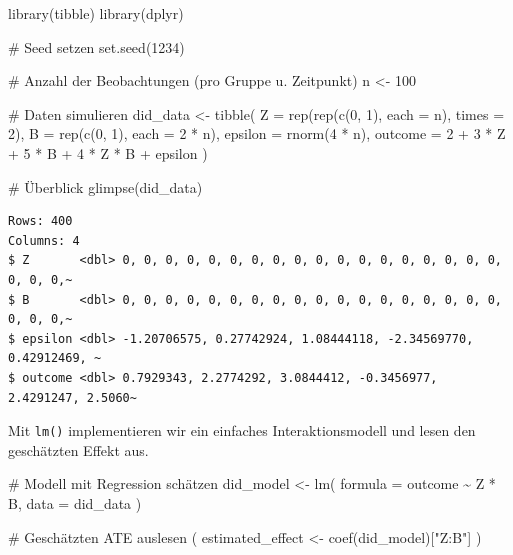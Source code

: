 \documentclass[
  a4paper,
  DIV=11,
  oneside]{scrreprt}
\newenvironment{Shaded}{\begin{snugshade}}{\end{snugshade}}
\newcommand{\AttributeTok}[1]{\textcolor[rgb]{0.40,0.45,0.13}{#1}}
\newcommand{\CommentTok}[1]{\textcolor[rgb]{0.37,0.37,0.37}{#1}}
\newcommand{\DecValTok}[1]{\textcolor[rgb]{0.68,0.00,0.00}{#1}}
\newcommand{\FunctionTok}[1]{\textcolor[rgb]{0.28,0.35,0.67}{#1}}
\newcommand{\NormalTok}[1]{\textcolor[rgb]{0.00,0.23,0.31}{#1}}
\newcommand{\OtherTok}[1]{\textcolor[rgb]{0.00,0.23,0.31}{#1}}
\newcommand{\SpecialCharTok}[1]{\textcolor[rgb]{0.37,0.37,0.37}{#1}}
\newcommand{\StringTok}[1]{\textcolor[rgb]{0.13,0.47,0.30}{#1}}
\begin{document}
\begin{Shaded}
\begin{Highlighting}[]
\FunctionTok{library}\NormalTok{(tibble)}
\FunctionTok{library}\NormalTok{(dplyr)}

\CommentTok{\# Seed setzen}
\FunctionTok{set.seed}\NormalTok{(}\DecValTok{1234}\NormalTok{)}

\CommentTok{\# Anzahl der Beobachtungen (pro Gruppe u. Zeitpunkt)}
\NormalTok{n }\OtherTok{\textless{}{-}} \DecValTok{100}

\CommentTok{\# Daten simulieren}
\NormalTok{did\_data }\OtherTok{\textless{}{-}} \FunctionTok{tibble}\NormalTok{(}
  \AttributeTok{Z =} \FunctionTok{rep}\NormalTok{(}\FunctionTok{rep}\NormalTok{(}\FunctionTok{c}\NormalTok{(}\DecValTok{0}\NormalTok{, }\DecValTok{1}\NormalTok{), }\AttributeTok{each =}\NormalTok{ n), }\AttributeTok{times =} \DecValTok{2}\NormalTok{),}
  \AttributeTok{B =} \FunctionTok{rep}\NormalTok{(}\FunctionTok{c}\NormalTok{(}\DecValTok{0}\NormalTok{, }\DecValTok{1}\NormalTok{), }\AttributeTok{each =} \DecValTok{2} \SpecialCharTok{*}\NormalTok{ n),}
  \AttributeTok{epsilon =} \FunctionTok{rnorm}\NormalTok{(}\DecValTok{4} \SpecialCharTok{*}\NormalTok{ n),}
  \AttributeTok{outcome =} \DecValTok{2} \SpecialCharTok{+} \DecValTok{3} \SpecialCharTok{*}\NormalTok{ Z }\SpecialCharTok{+} \DecValTok{5} \SpecialCharTok{*}\NormalTok{ B }\SpecialCharTok{+} \DecValTok{4} \SpecialCharTok{*}\NormalTok{ Z }\SpecialCharTok{*}\NormalTok{ B }\SpecialCharTok{+}\NormalTok{ epsilon}
\NormalTok{)}

\CommentTok{\# Überblick}
\FunctionTok{glimpse}\NormalTok{(did\_data)}
\end{Highlighting}
\end{Shaded}

\begin{verbatim}
Rows: 400
Columns: 4
$ Z       <dbl> 0, 0, 0, 0, 0, 0, 0, 0, 0, 0, 0, 0, 0, 0, 0, 0, 0, 0, 0, 0, 0,~
$ B       <dbl> 0, 0, 0, 0, 0, 0, 0, 0, 0, 0, 0, 0, 0, 0, 0, 0, 0, 0, 0, 0, 0,~
$ epsilon <dbl> -1.20706575, 0.27742924, 1.08444118, -2.34569770, 0.42912469, ~
$ outcome <dbl> 0.7929343, 2.2774292, 3.0844412, -0.3456977, 2.4291247, 2.5060~
\end{verbatim}

Mit \texttt{lm()} implementieren wir ein einfaches Interaktionsmodell
und lesen den geschätzten Effekt aus.

\begin{Shaded}
\begin{Highlighting}[]
\CommentTok{\# Modell mit Regression schätzen}
\NormalTok{did\_model }\OtherTok{\textless{}{-}} \FunctionTok{lm}\NormalTok{(}
  \AttributeTok{formula =}\NormalTok{ outcome }\SpecialCharTok{\textasciitilde{}}\NormalTok{ Z }\SpecialCharTok{*}\NormalTok{ B, }
  \AttributeTok{data =}\NormalTok{ did\_data}
\NormalTok{)}

\CommentTok{\# Geschätzten ATE auslesen}
\NormalTok{(}
\NormalTok{  estimated\_effect }\OtherTok{\textless{}{-}} \FunctionTok{coef}\NormalTok{(did\_model)[}\StringTok{"Z:B"}\NormalTok{]}
\NormalTok{)}
\end{Highlighting}
\end{Shaded}
\end{document}
